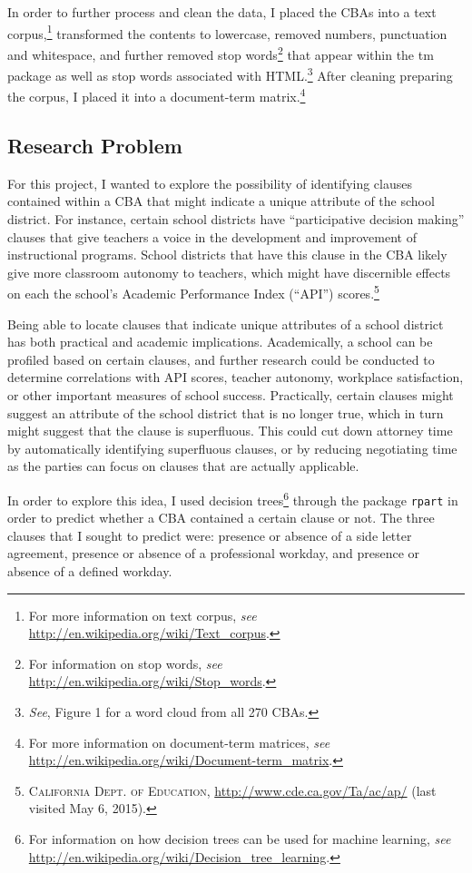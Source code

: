 In order to further process and clean the data, I placed the CBAs into a text corpus,\footnote{\hspace{2ex}For more information on text corpus, \textit{see} \url{http://en.wikipedia.org/wiki/Text_corpus}.}  transformed the contents to lowercase, removed numbers, punctuation and whitespace, and further removed stop words\footnote{\hspace{2ex}For information on stop words, \textit{see} \url{http://en.wikipedia.org/wiki/Stop_words}.} that appear within the tm package as well as stop words associated with HTML.\footnote{\hspace{2ex}\textit{See}, Figure 1 for a word cloud from all 270 CBAs.}  After cleaning preparing the corpus, I placed it into a document-term matrix.\footnote{\hspace{2ex}For more information on document-term matrices, \textit{see} \url{http://en.wikipedia.org/wiki/Document-term_matrix}.}

\subsection{Research Problem}

For this project, I wanted to explore the possibility of identifying clauses contained within a CBA that might indicate a unique attribute of the school district. For instance, certain school districts have “participative decision making” clauses that give teachers a voice in the development and improvement of instructional programs. School districts that have this clause in the CBA likely give more classroom autonomy to teachers, which might have discernible effects on each the school’s Academic Performance Index (“API”) scores.\footnote{\hspace{2ex}\textsc{California Dept. of Education}, \url{http://www.cde.ca.gov/Ta/ac/ap/} (last visited May 6, 2015).}

Being able to locate clauses that indicate unique attributes of a school district has both practical and academic implications. Academically, a school can be profiled based on certain clauses, and further research could be conducted to determine correlations with API scores, teacher autonomy, workplace satisfaction, or other important measures of school success. Practically, certain clauses might suggest an attribute of the school district that is no longer true, which in turn might suggest that the clause is superfluous. This could cut down attorney time by automatically identifying superfluous clauses, or by reducing negotiating time as the parties can focus on clauses that are actually applicable. 

In order to explore this idea, I used decision trees\footnote{\hspace{2ex}For information on how decision trees can be used for machine learning, \textit{see} \url{http://en.wikipedia.org/wiki/Decision_tree_learning}.} through the package \texttt{rpart} in order to predict whether a CBA contained a certain clause or not. The three clauses that I sought to predict were: presence or absence of a side letter agreement, presence or absence of a professional workday, and presence or absence of a defined workday. 
